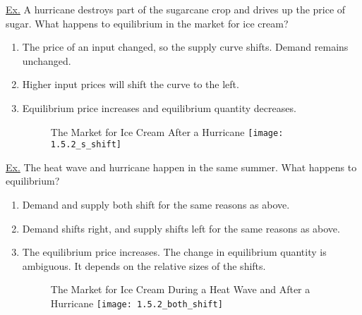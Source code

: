 	\newpage
	
	\noindent \underline{Ex.} A hurricane destroys part of the sugarcane crop and drives up the price of sugar. What happens to equilibrium in the market for ice cream?
	
	\begin{enumerate}
	
	\item The price of an input changed, so the supply curve shifts. Demand remains unchanged.
	
	\item Higher input prices will shift the curve to the left. 
	
	\item Equilibrium price increases and equilibrium quantity decreases. 
	
	\begin{figure}[h]
	The Market for Ice Cream After a Hurricane
	\centering
	\texttt{[image: 1.5.2\_s\_shift]}
	\end{figure}
	
	\end{enumerate}
	
	\newpage
	
	\noindent \underline{Ex.} The heat wave and hurricane happen in the same summer. What happens to equilibrium?
	
	\begin{enumerate}
	
	\item Demand and supply both shift for the same reasons as above.
	
	\item Demand shifts right, and supply shifts left for the same reasons as above.
	
	\item The equilibrium price increases. The change in equilibrium quantity is ambiguous. It depends on the relative sizes of the shifts. 
	
	\begin{figure}[h]
	The Market for Ice Cream During a Heat Wave and After a Hurricane
	\centering
	\texttt{[image: 1.5.2\_both\_shift]}
	\end{figure}
	
	\end{enumerate}



